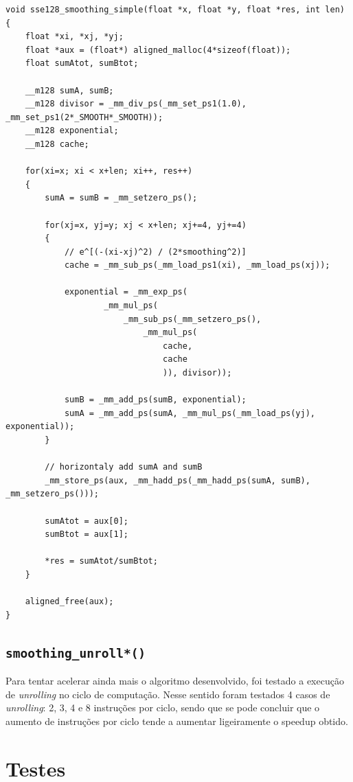 \documentclass[a4paper]{article}
\begin{document}
	\begin{verbatim}
void sse128_smoothing_simple(float *x, float *y, float *res, int len) {
    float *xi, *xj, *yj;
    float *aux = (float*) aligned_malloc(4*sizeof(float));
    float sumAtot, sumBtot;

    __m128 sumA, sumB;
    __m128 divisor = _mm_div_ps(_mm_set_ps1(1.0), _mm_set_ps1(2*_SMOOTH*_SMOOTH));
    __m128 exponential;
    __m128 cache;

    for(xi=x; xi < x+len; xi++, res++)
    {
        sumA = sumB = _mm_setzero_ps();

        for(xj=x, yj=y; xj < x+len; xj+=4, yj+=4)
        {
            // e^[(-(xi-xj)^2) / (2*smoothing^2)]
            cache = _mm_sub_ps(_mm_load_ps1(xi), _mm_load_ps(xj));
            
            exponential = _mm_exp_ps(
                    _mm_mul_ps(
                        _mm_sub_ps(_mm_setzero_ps(),
                            _mm_mul_ps(
                                cache,
                                cache
                                )), divisor));

            sumB = _mm_add_ps(sumB, exponential);
            sumA = _mm_add_ps(sumA, _mm_mul_ps(_mm_load_ps(yj), exponential));
        }

        // horizontaly add sumA and sumB
        _mm_store_ps(aux, _mm_hadd_ps(_mm_hadd_ps(sumA, sumB), _mm_setzero_ps()));

        sumAtot = aux[0];
        sumBtot = aux[1];

        *res = sumAtot/sumBtot;
    }

    aligned_free(aux);
}
	\end{verbatim}		

	
	\subsection{\texttt{smoothing\_unroll*()}}
	
	Para tentar acelerar ainda mais o algoritmo desenvolvido, foi testado a execução de \textit{unrolling} no ciclo de computação. Nesse sentido foram testados 4 casos de \textit{unrolling}: 2, 3, 4 e 8 instruções por ciclo, sendo que se pode concluir que o aumento de instruções por ciclo tende a aumentar ligeiramente o speedup obtido.
	
	
	\section{Testes} 
		
\end{document}
